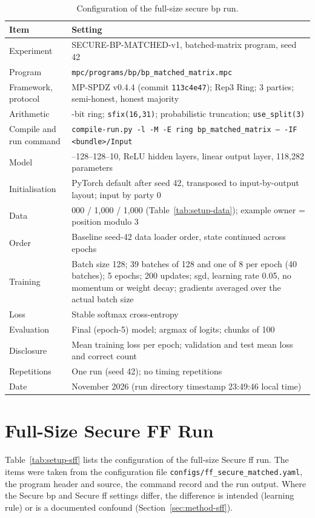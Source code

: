 \begin{table}[ht]
\centering
\small
\begin{tabular}{@{}>{\raggedright\arraybackslash}p{4.3cm}>{\raggedright\arraybackslash}p{9.6cm}@{}}
\toprule
Item & Setting \\
\midrule
Experiment & SECURE-BP-MATCHED-v1, batched-matrix program, seed 42 \\
Program & \texttt{mpc/programs/bp/bp\_matched\_matrix.mpc} \\
Framework, protocol & MP-SPDZ v0.4.4 (commit \texttt{113c4e47}); Rep3 Ring; 3 parties; semi-honest, honest majority \\
Arithmetic & 64-bit ring; \texttt{sfix(16,31)}; probabilistic truncation; \texttt{use\_split(3)} \\
Compile and run command & \texttt{compile-run.py -l -M -E ring bp\_matched\_matrix -- -IF \textless{}bundle\textgreater{}/Input} \\
Model & 784--128--128--10, ReLU hidden layers, linear output layer, 118{,}282 parameters \\
Initialisation & PyTorch default after seed 42, transposed to input-by-output layout; input by party 0 \\
Data & 5{,}000 / 1{,}000 / 1{,}000 (Table~\ref{tab:setup-data}); example owner = position modulo 3 \\
Order & Baseline seed-42 data loader order, state continued across epochs \\
Training & Batch size 128; 39 batches of 128 and one of 8 per epoch (40 batches); 5 epochs; 200 updates; \ac{sgd}, learning rate 0.05, no momentum or weight decay; gradients averaged over the actual batch size \\
Loss & Stable softmax cross-entropy \\
Evaluation & Final (epoch-5) model; argmax of logits; chunks of 100 \\
Disclosure & Mean training loss per epoch; validation and test mean loss and correct count \\
Repetitions & One run (seed 42); no timing repetitions \\
Date & 15 November 2026 (run directory timestamp 23:49:46 local time) \\
\bottomrule
\end{tabular}
\caption{Configuration of the full-size secure \ac{bp} run.}
\label{tab:setup-full}
\end{table}

\section{Full-Size Secure FF Run}\label{sec:setup-sff}
Table~\ref{tab:setup-sff} lists the configuration of the full-size Secure \ac{ff} run. The items were taken from the configuration file \texttt{configs/\allowbreak ff\_\allowbreak secure\_\allowbreak matched.yaml}, the program header and source, the command record and the run output. Where the Secure \ac{bp} and Secure \ac{ff} settings differ, the difference is intended (learning rule) or is a documented confound (Section~\ref{sec:method-sff}).

